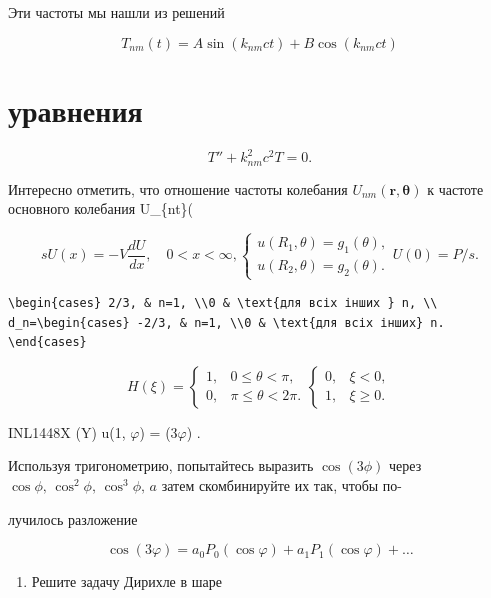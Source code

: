 \documentclass[
  ukrainian,
]{article}
\providecommand{\tightlist}{%
  \setlength{\itemsep}{0pt}\setlength{\parskip}{0pt}}
\begin{document}
Эти частоты мы нашли из решений

\[
T_{nm}(t) = A \sin(k_{nm}ct) + B \cos(k_{nm}ct)
\]

\section{уравнения}\label{ux443ux440ux430ux432ux43dux435ux43dux438ux44f}

\[
T'' + k_{nm}^2 c^2 T = 0.
\]

Интересно отметить, что отношение частоты колебания
\(U_{nm}(\mathbf{r}, \mathbf{\theta})\) к частоте основного колебания
U\_\{nt\}(\ma

\[
sU(x) = -V \frac{dU}{dx}, \quad 0 < x < \infty,
\begin{cases} u(R_1, \theta) = g_1(\theta), \\ u(R_2, \theta) = g_2(\theta). \end{cases}
U(0) = P/s.
\]

\begin{verbatim}
\begin{cases} 2/3, & n=1, \\0 & \text{для всіх інших } n, \\ d_n=\begin{cases} -2/3, & n=1, \\0 & \text{для всіх інших} n. \end{cases}
\end{verbatim}

\[
H(\xi) =
\begin{cases} 1, & 0 \le \theta < \pi, \\ 0, & \pi \le \theta < 2\pi. \end{cases}
\begin{cases} 0, & \xi < 0, \\ 1, & \xi \geqslant 0. \end{cases}
\]

INL1448X (\Gamma Y) u(1, \(\varphi\)) = \cos(3\(\varphi\)) .

Используя тригонометрию, попытайтесь выразить \(\cos{(3\phi)}\) через
\(\cos{\phi}, \, \cos^2{\phi}, \, \cos^3{\phi}, \, a\) затем
скомбинируйте их так, чтобы по-

лучилось разложение

\[
\cos(3\varphi) = a_0 P_0(\cos\varphi) + a_1 P_1(\cos\varphi) + \dots
\]

\begin{enumerate}
\def\labelenumi{\arabic{enumi}.}
\setcounter{enumi}{4}
\tightlist
\item
  Решите задачу Дирихле в шаре
\end{enumerate}
\end{document}
